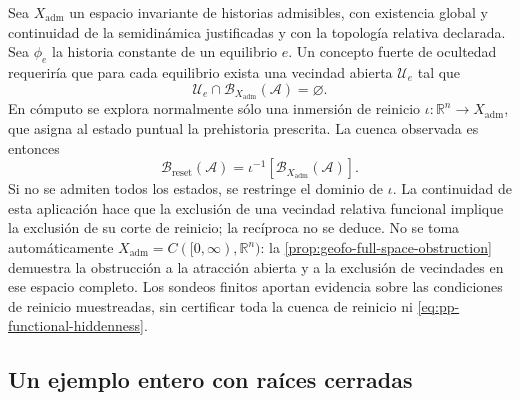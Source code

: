 Sea \(X_{\mathrm{adm}}\) un espacio invariante de historias admisibles,
con existencia global y continuidad de la semidinámica justificadas y con
la topología relativa declarada. Sea \(\phi_e\) la historia constante de un
equilibrio \(e\). Un concepto fuerte de ocultedad requeriría que para cada
equilibrio exista una vecindad abierta \(\mathcal U_e\) tal que
\begin{equation}
 \mathcal U_e\cap\mathcal B_{X_{\mathrm{adm}}}(\mathcal A)=\varnothing.
 \label{eq:pp-functional-hiddenness}
\end{equation}
En cómputo se explora normalmente sólo una inmersión de reinicio
\(\iota:\mathbb R^n\to X_{\mathrm{adm}}\), que asigna al estado puntual la
prehistoria prescrita. La cuenca observada es entonces
\begin{equation}
 \mathcal B_{\mathrm{reset}}(\mathcal A)
 =\iota^{-1}[\mathcal B_{X_{\mathrm{adm}}}(\mathcal A)].
 \label{eq:pp-reset-section-basin}
\end{equation}
Si no se admiten todos los estados, se restringe el dominio de \(\iota\).
La continuidad de esta aplicación hace que la exclusión de una vecindad
relativa funcional implique la exclusión de su corte de reinicio; la
recíproca no se deduce. No se toma automáticamente
\(X_{\mathrm{adm}}=C([0,\infty),\mathbb R^n)\): la
\cref{prop:geofo-full-space-obstruction} demuestra la obstrucción a la
atracción abierta y a la exclusión de vecindades en ese espacio completo.
Los sondeos finitos aportan evidencia sobre las condiciones de reinicio
muestreadas, sin certificar toda la cuenca de reinicio ni
\cref{eq:pp-functional-hiddenness}.

\subsection{Un ejemplo entero con raíces cerradas}

